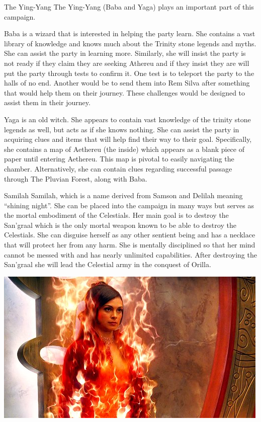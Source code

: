 \begin{commentbox}{The Ying-Yang}
	The Ying-Yang (Baba and Yaga) plays an important part of this campaign. 
	
	Baba is a wizard that is interested in helping the party learn. She contains a vast library of knowledge and knows much about the Trinity stone legends and myths. She can assist the party in learning more. Similarly, she will insist the party is not ready if they claim they are seeking Athereu and if they insist they are will put the party through tests to confirm it. One test is to teleport the party to the halls of no end. Another would be to send them into Rem Silva after something that would help them on their journey. These challenges would be designed to assist them in their journey. 
	
	Yaga is an old witch. She appears to contain vast knowledge of the trinity stone legends as well, but acts as if she knows nothing. She can assist the party in acquiring clues and items that will help find their way to their goal. Specifically, she contains a map of Aethereu (the inside) which appears as a blank piece of paper until entering Aethereu. This map is pivotal to easily navigating the chamber. Alternatively, she can contain clues regarding successful passage through The Pluvian Forest, along with Baba.
\end{commentbox}



\begin{commentbox}{Samilah}
	Samilah, which is a name derived from Samson and Delilah meaning ``shining night''. She can be placed into the campaign in many ways but serves as the mortal embodiment of the Celestials. Her main goal is to destroy the San'graal which is the only mortal weapon known to be able to destroy the Celestials. She can disguise herself as any other sentient being and has a necklace that will protect her from any harm. She is mentally disciplined so that her mind cannot be messed with and has nearly unlimited capabilities. After destroying the San'graal she will lead the Celestial army in the conquest of Orilla.
	\begin{center}
		\includegraphics[width=0.7\linewidth]{img/samilah.jpg}
	\end{center}
\end{commentbox}

